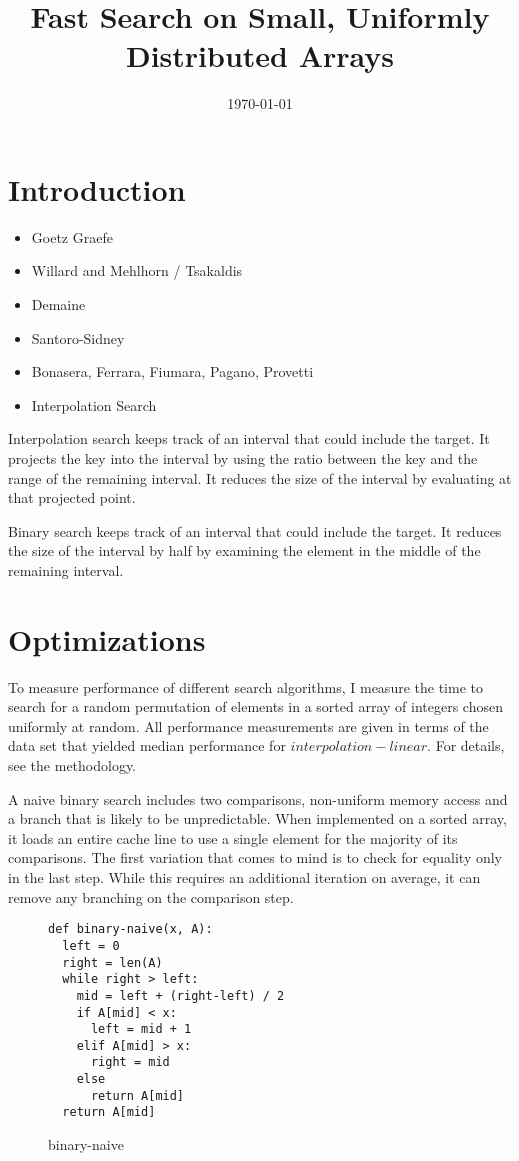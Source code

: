 \documentclass{article}
\title{Fast Search on Small, Uniformly Distributed Arrays}
\date{\today}
\begin{document}
\section{Introduction}
\begin{itemize}
  \item Goetz Graefe
  \item Willard and Mehlhorn / Tsakaldis
  \item Demaine
  \item Santoro-Sidney
  \item Bonasera, Ferrara, Fiumara, Pagano, Provetti 
  \item Interpolation Search
\end{itemize}
Interpolation search keeps track of an interval that could include the target. It projects the key into the interval by using the ratio between the key and the range of the remaining interval. It reduces the size of the interval by evaluating at that projected point.

Binary search keeps track of an interval that could include the target. It reduces the size of the interval by half by examining the element in the middle of the remaining interval.
\section{Optimizations}
To measure performance of different search algorithms, I measure the time to search for a random permutation of elements in a sorted array of integers chosen uniformly at random. All performance measurements are given in terms of the data set that yielded median performance for $interpolation-linear$. For details, see the methodology.

A naive binary search includes two comparisons, non-uniform memory access and a branch that is likely to be unpredictable. When implemented on a sorted array, it loads an entire cache line to use a single element for the majority of its comparisons. The first variation that comes to mind is to check for equality only in the last step. While this requires an additional iteration on average, it can remove any branching on the comparison step.

\begin{figure}[h]
\begin{verbatim}
def binary-naive(x, A):
  left = 0
  right = len(A)
  while right > left:
    mid = left + (right-left) / 2
    if A[mid] < x:
      left = mid + 1
    elif A[mid] > x:
      right = mid 
    else
      return A[mid]
  return A[mid]
\end{verbatim}
\caption{binary-naive}
\end{figure}
\end{document}
